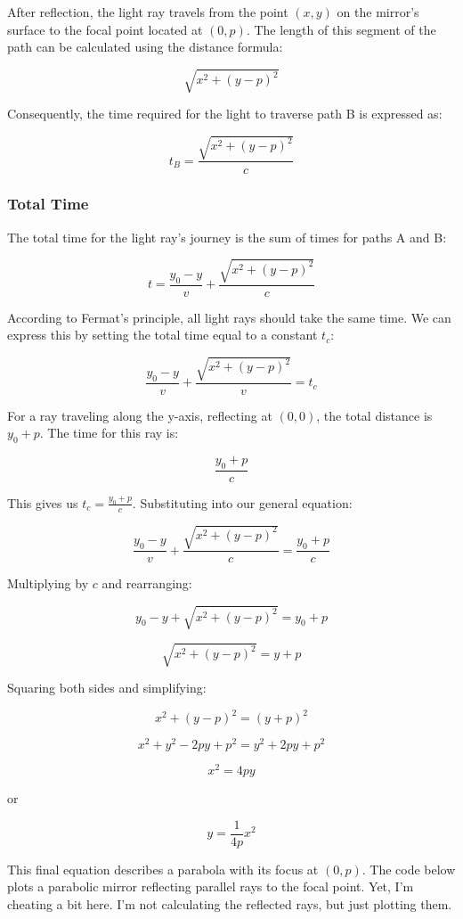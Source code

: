 \documentclass[
  a4paper,
]{book}
\begin{document}
\begin{tcolorbox}
After reflection, the light ray travels from the point \((x, y)\) on the
mirror's surface to the focal point located at \((0, p)\). The length of
this segment of the path can be calculated using the distance formula:

\[
\sqrt{x^2 + (y - p)^2}
\]

Consequently, the time required for the light to traverse path B is
expressed as:

\[
t_B = \frac{\sqrt{x^2 + (y - p)^2}}{c}
\]

\subsubsection{Total Time}\label{total-time}

The total time for the light ray's journey is the sum of times for paths
A and B:

\[
t = \frac{y_0 - y}{v} + \frac{\sqrt{x^2 + (y - p)^2}}{c}
\]

According to Fermat's principle, all light rays should take the same
time. We can express this by setting the total time equal to a constant
\(t_c\):

\[
\frac{y_0 - y}{v} + \frac{\sqrt{x^2 + (y - p)^2}}{v} = t_c
\]

For a ray traveling along the y-axis, reflecting at \((0, 0)\), the
total distance is \(y_0 + p\). The time for this ray is:

\[
\frac{y_0 + p}{c}
\]

This gives us \(t_c = \frac{y_0 + p}{c}\). Substituting into our general
equation:

\[
\frac{y_0 - y}{v} + \frac{\sqrt{x^2 + (y - p)^2}}{c} = \frac{y_0 + p}{c}
\]

Multiplying by \(c\) and rearranging:

\[
y_0 - y + \sqrt{x^2 + (y - p)^2} = y_0 + p
\]

\[
\sqrt{x^2 + (y - p)^2} = y + p
\]

Squaring both sides and simplifying:

\[
x^2 + (y - p)^2 = (y + p)^2
\]

\[
x^2 + y^2 - 2py + p^2 = y^2 + 2py + p^2
\]

\[
x^2 = 4py
\]

or

\[
y=\frac{1}{4p}x^2
\]

This final equation describes a parabola with its focus at \((0, p)\).
The code below plots a parabolic mirror reflecting parallel rays to the
focal point. Yet, I'm cheating a bit here. I'm not calculating the
reflected rays, but just plotting them.


\end{tcolorbox}
\end{document}
